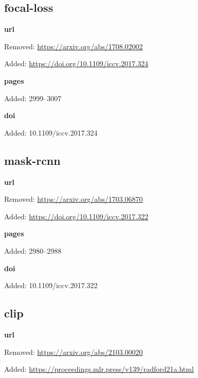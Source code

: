 \subsection*{focal-loss}
\noindent\textbf{url}\par
{\color{AuditRed}Removed: \url{https://arxiv.org/abs/1708.02002}\par}
{\color{AuditGreen}Added: \url{https://doi.org/10.1109/iccv.2017.324}\par}
\noindent\textbf{pages}\par
{\color{AuditGreen}Added: 2999–3007\par}
\noindent\textbf{doi}\par
{\color{AuditGreen}Added: 10.1109/iccv.2017.324\par}
\medskip

\subsection*{mask-rcnn}
\noindent\textbf{url}\par
{\color{AuditRed}Removed: \url{https://arxiv.org/abs/1703.06870}\par}
{\color{AuditGreen}Added: \url{https://doi.org/10.1109/iccv.2017.322}\par}
\noindent\textbf{pages}\par
{\color{AuditGreen}Added: 2980–2988\par}
\noindent\textbf{doi}\par
{\color{AuditGreen}Added: 10.1109/iccv.2017.322\par}
\medskip

\subsection*{clip}
\noindent\textbf{url}\par
{\color{AuditRed}Removed: \url{https://arxiv.org/abs/2103.00020}\par}
{\color{AuditGreen}Added: \url{https://proceedings.mlr.press/v139/radford21a.html}\par}
\medskip

